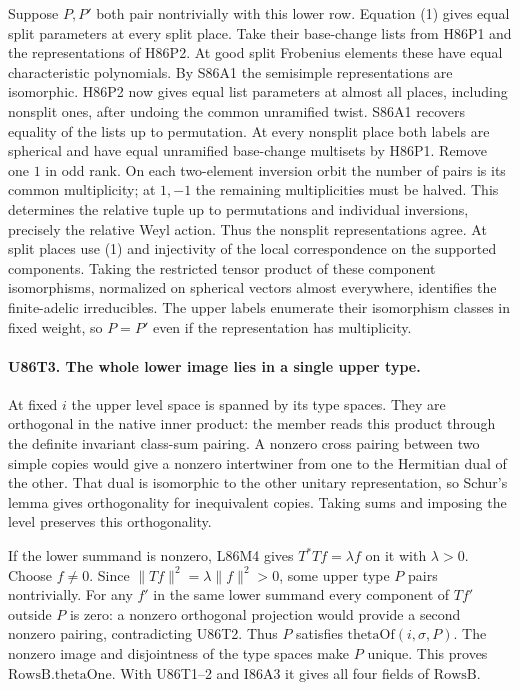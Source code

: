 Suppose $P,P'$ both pair nontrivially with this lower row.
Equation (1) gives equal split parameters at every split place.
Take their base-change lists from H86P1 and the representations
of H86P2. At good split Frobenius elements these have equal
characteristic polynomials. By S86A1 the semisimple representations
are isomorphic. H86P2 now gives equal list parameters at almost
all places, including nonsplit ones, after undoing the common
unramified twist. S86A1 recovers equality of the lists up to
permutation. At every nonsplit place both labels are spherical
and have equal unramified base-change multisets by H86P1. Remove
one $1$ in odd rank. On each two-element inversion orbit the number
of pairs is its common multiplicity; at $1,-1$ the remaining
multiplicities must be halved. This determines the relative tuple
up to permutations and individual inversions, precisely the
relative Weyl action. Thus the nonsplit representations agree.
At split places use (1) and injectivity of the local correspondence
on the supported components. Taking the restricted tensor product
of these component isomorphisms, normalized on spherical vectors
almost everywhere, identifies the finite-adelic irreducibles.
The upper labels enumerate their isomorphism classes in fixed
weight, so $P=P'$ even if the representation has multiplicity.

\paragraph{U86T3. The whole lower image lies in a single upper type.}
At fixed $i$ the upper level space is spanned by its type spaces.
They are orthogonal in the native inner product: the member reads
this product through the definite invariant class-sum pairing.
A nonzero cross pairing between two simple copies would give a
nonzero intertwiner from one to the Hermitian dual of the other.
That dual is isomorphic to the other unitary representation, so
Schur's lemma gives orthogonality for inequivalent copies. Taking
sums and imposing the level preserves this orthogonality.

If the lower summand is nonzero, L86M4 gives $T^*Tf=\lambda f$
on it with $\lambda>0$. Choose $f\ne0$. Since
$\|Tf\|^2=\lambda\|f\|^2>0$, some upper type $P$ pairs nontrivially.
For any $f'$ in the same lower summand every component of $Tf'$
outside $P$ is zero: a nonzero orthogonal projection would provide
a second nonzero pairing, contradicting U86T2. Thus $P$ satisfies
$\mathrm{thetaOf}(i,\sigma,P)$. The nonzero image and disjointness
of the type spaces make $P$ unique. This proves
$\mathrm{RowsB.thetaOne}$. With U86T1--2 and I86A3 it gives all
four fields of $\mathrm{RowsB}$.

